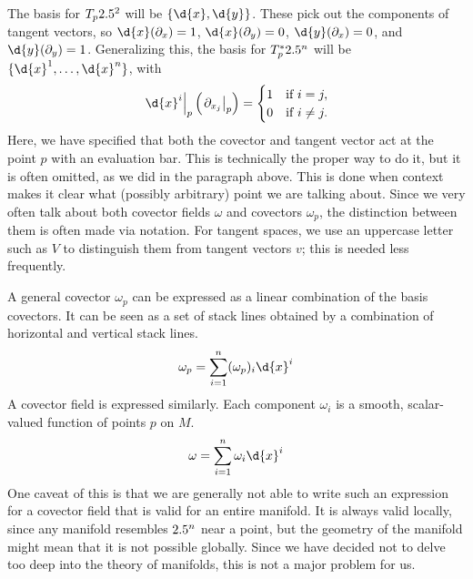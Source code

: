 \documentclass[a4paper,12pt]{article}
\begin{document}
The basis for $T_p 2.5^2$ will be $\{\d{x}, \d{y}\}$.
These pick out the components of tangent vectors, so $\d{x}(\partial_x) = 1$, $\d{x}(\partial_y) = 0$, $\d{y}(\partial_x) = 0$, and $\d{y}(\partial_y) = 1$.
Generalizing this, the basis for $T^*_p 2.5^n$ will be $\{\d{x}^1, \ldots, \d{x}^n\}$, with
\begin{equation*}
    \eval{\d{x}^i}{p} \left(\eval{\partial_{x_j}}{p}\right) = \begin{cases}
        1 & \text{if } i = j,\\
        0 & \text{if } i \neq j.
    \end{cases}
\end{equation*}
Here, we have specified that both the covector and tangent vector act at the point $p$ with an evaluation bar.
This is technically the proper way to do it, but it is often omitted, as we did in the paragraph above.
This is done when context makes it clear what (possibly arbitrary) point we are talking about.
Since we very often talk about both covector fields $\omega$ and covectors $\omega_p$, the distinction between them is often made via notation.
For tangent spaces, we use an uppercase letter such as $V$ to distinguish them from tangent vectors $v$; this is needed less frequently.

A general covector $\omega_p$ can be expressed as a linear combination of the basis covectors.
It can be seen as a set of stack lines obtained by a combination of horizontal and vertical stack lines.
\begin{equation*}
    \omega_p = \sum_{i=1}^{n} (\omega_p)_i \d{x}^i
\end{equation*}
A covector field is expressed similarly.
Each component $\omega_i$ is a smooth, scalar-valued function of points $p$ on $M$.
\begin{equation*}
    \omega = \sum_{i=1}^{n} \omega_i \d{x}^i
\end{equation*}
One caveat of this is that we are generally not able to write such an expression for a covector field that is valid for an entire manifold.
It is always valid locally, since any manifold resembles $2.5^n$ near a point, but the geometry of the manifold might mean that it is not possible globally.
Since we have decided not to delve too deep into the theory of manifolds, this is not a major problem for us.
\end{document}
